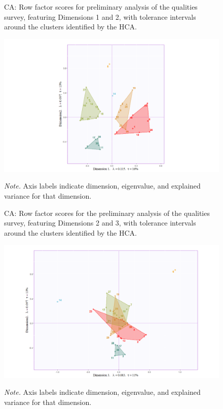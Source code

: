 \documentclass[
]{article}
\begin{document}
\begin{figure}   
  \centering  
  \caption{CA: Row factor scores for preliminary analysis of the qualities survey, featuring Dimensions 1 and 2, with tolerance intervals around the clusters identified by the HCA.}
    \includegraphics{./supmatsimgs/qfactormap12.png}
  \label{fig:qimap12}
  \caption*{\footnotesize \textit{Note.} Axis labels indicate dimension, eigenvalue, and explained variance for that dimension.}
\end{figure}

\begin{figure}   
  \centering  
  \caption{CA: Row factor scores for the preliminary analysis of the qualities survey, featuring Dimensions 2 and 3, with tolerance intervals around the clusters identified by the HCA.}
    \includegraphics{./supmatsimgs/qfactormap23.png}
  \label{fig:qimap23}
  \caption*{\footnotesize \textit{Note.} Axis labels indicate dimension, eigenvalue, and explained variance for that dimension.}
\end{figure}
\end{document}
